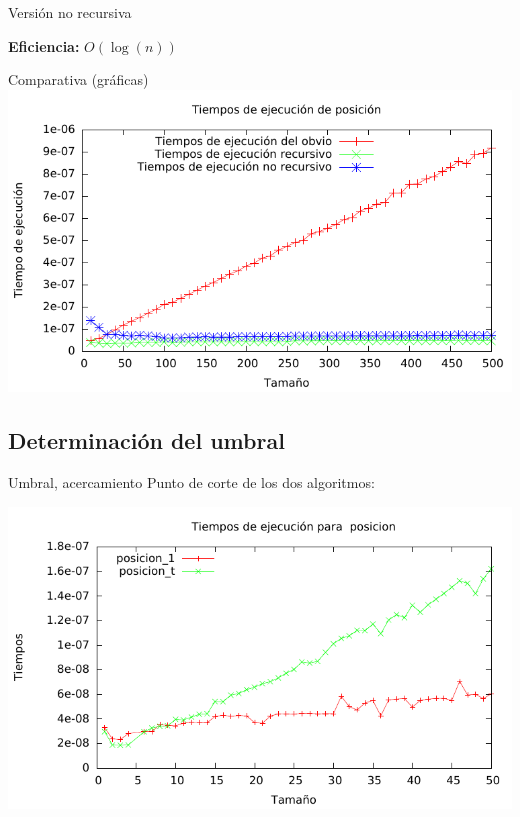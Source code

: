 \begin{frame}[fragile]{Versión no recursiva}

\textbf{Eficiencia:} $O(\log(n))$
\end{frame}


\begin{frame}{Comparativa (gráficas)}
	\includegraphics[width=\textwidth]{img/posicion_1_comparativa_todos.pdf}
\end{frame}


\subsection{Determinación del umbral}


\begin{frame}{Umbral, acercamiento}
	Punto de corte de los dos algoritmos:
	
	
	\includegraphics[width=\textwidth]{img/posicion_todos1_g_50.pdf}
	
\end{frame}

